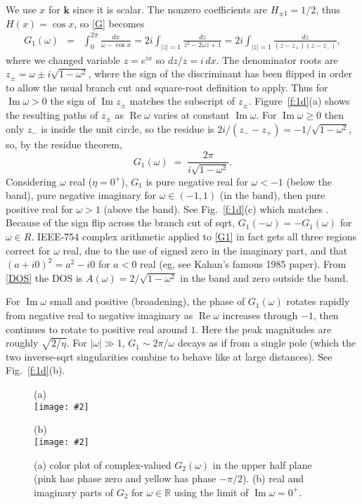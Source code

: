 \documentclass[11pt]{article}
\newcommand{\be}{\begin{equation}}
\newcommand{\ee}{\end{equation}}
\newcommand{\bea}{\begin{eqnarray}}
\newcommand{\eea}{\end{eqnarray}}
\newcommand{\bfi}{\begin{figure}}
\newcommand{\efi}{\end{figure}}
\newcommand{\ca}[2]{\caption{#1 \label{#2}}}
\newcommand{\ig}[2]{\texttt{[image: \#2]}}
\newcommand{\bmp}[1]{\begin{minipage}{#1}}
\newcommand{\emp}{\end{minipage}}
\newcommand{\mbf}[1]{{\mathbf #1}}
\newcommand{\R}{\mathbb{R}}
\DeclareMathOperator{\re}{Re}
\DeclareMathOperator{\im}{Im}
\newcommand{\om}{\omega}
\newcommand{\kk}{\mbf{k}}
\begin{document}
We use $x$ for $\kk$ since it is scalar.
The nonzero coefficients are $H_{\pm 1} = 1/2$,
thus $H(x) = \cos x$,
so \eqref{G} becomes
\bea
G_1(\om) &=& \int_0^{2\pi} \frac{dx}{\om - \cos x}
= 2i \int_{|z|=1} \frac{dz}{z^2-2\om z + 1}
= 2i \int_{|z|=1} \frac{dz}{(z-z_+)(z-z_-)},
\label{G1def}
\eea
where we changed variable $z = e^{ix}$ so $dz/z = i\,dx$.
The denominator roots are $z_\pm = \om\pm i\sqrt{1-\om^2}$, where
the sign of the discriminant has been flipped in order to allow
the usual branch cut and square-root definition to apply.
Thus for $\im \om > 0$ the sign of $\im z_\pm$
matches the subscript of $z_\pm$.
Figure~\ref{f:1d}(a) shows the resulting paths of $z_\pm$ as $\re \om$
varies at constant $\im \om$.
For $\im \om \ge 0$ then only $z_-$ is inside the unit circle, so
the residue is $2i/(z_--z_+) = -1/\sqrt{1-\om^2}$, so, by
the residue theorem,
\be
G_1(\om) \;=\; \frac{2\pi}{i \sqrt{1-\om^2}}.
\label{G1}
\ee
Considering $\om$ real ($\eta=0^+$),
$G_1$ is pure negative real for $\om<-1$ (below the band),
pure negative imaginary for $\om \in (-1,1)$ (in the band),
then pure positive real for $\om>1$ (above the band).
See Fig.~\ref{f:1d}(c) which matches \cite[Fig.~5.6]{economou}.
Because of the sign flip across the branch cut of sqrt,
$G_1(-\om) = -G_1(\om)$ for $\om\in R$.
IEEE-754 complex arithmetic applied to \eqref{G1} in fact gets
all three regions correct for $\om$ real, due to the use of signed zero in the
imaginary part, and that $(a+i0)^2 = a^2-i0$ for $a<0$ real
(eg, see Kahan's famous 1985 paper).
From \eqref{DOS} the DOS is $A(\om) = 2/\sqrt{1-\om^2}$ in the band and zero
outside the band.

For $\im \om$ small and positive (broadening),
the phase of $G_1(\om)$ rotates rapidly from negative real to negative imaginary as
$\re\om$ increases through $-1$, then continues to rotate to positive real
around $1$.
Here the peak magnitudes are roughly $\sqrt{2/\eta}$.
For $|\om|\gg 1$, $G_1 \sim 2\pi/\om$ decays as if from
a single pole (which the two inverse-sqrt singularities combine to
behave like at large distances). See Fig.~\ref{f:1d}(b).



\bfi %
\bmp{3in}
(a)
\\
\ig{width=3in}{2dband_cplane}
\emp
\bmp{3.4in}
(b)
\\
\ig{width=3.4in}{2dband_real}
\emp
\vspace{-2ex}
\ca{(a) color plot of complex-valued $G_2(\om)$ in the upper half plane
  (pink has phase zero and yellow has phase $-\pi/2$).
  (b) real and imaginary parts of $G_2$ for $\om\in\R$ using the limit
  of $\im \om = 0^+$.
}{f:2d}
\efi
\end{document}
